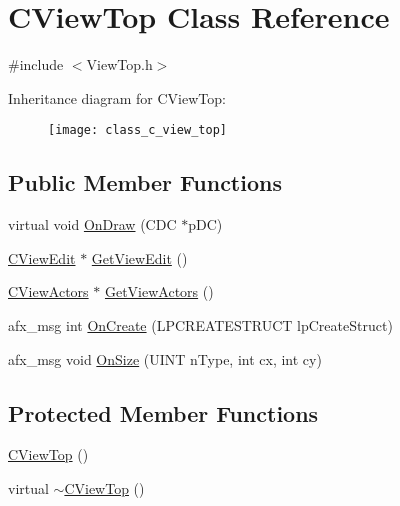 \hypertarget{class_c_view_top}{\section{C\+View\+Top Class Reference}
\label{class_c_view_top}
}


{\ttfamily \#include $<$View\+Top.\+h$>$}

Inheritance diagram for C\+View\+Top\+:\begin{figure}[H]
\begin{center}
\leavevmode
\texttt{[image: class\_c\_view\_top]}
\end{center}
\end{figure}
\subsection*{Public Member Functions}
\begin{DoxyCompactItemize}
\item 
virtual void \hyperlink{class_c_view_top_ac4b8af93a75df56478f39feff289f6a6}{On\+Draw} (C\+D\+C $\ast$p\+D\+C)
\item 
\hyperlink{class_c_view_edit}{C\+View\+Edit} $\ast$ \hyperlink{class_c_view_top_a775f50213ecac76ac57016bc402de42a}{Get\+View\+Edit} ()
\item 
\hyperlink{class_c_view_actors}{C\+View\+Actors} $\ast$ \hyperlink{class_c_view_top_a2057cf44f1f7a789b33e2ef8444b6db8}{Get\+View\+Actors} ()
\item 
afx\+\_\+msg int \hyperlink{class_c_view_top_a7e4cad13135855a66719ecb49a8ad3fc}{On\+Create} (L\+P\+C\+R\+E\+A\+T\+E\+S\+T\+R\+U\+C\+T lp\+Create\+Struct)
\item 
afx\+\_\+msg void \hyperlink{class_c_view_top_a171e02fdf1bef80245bbc37d77819f14}{On\+Size} (U\+I\+N\+T n\+Type, int cx, int cy)
\end{DoxyCompactItemize}
\subsection*{Protected Member Functions}
\begin{DoxyCompactItemize}
\item 
\hyperlink{class_c_view_top_a4cee9890cf66890c3cd79efdedf92d1b}{C\+View\+Top} ()
\item 
virtual \hyperlink{class_c_view_top_ad08e0ef0c01e33bb0278dc595467ad8c}{$\sim$\+C\+View\+Top} ()
\end{DoxyCompactItemize}


